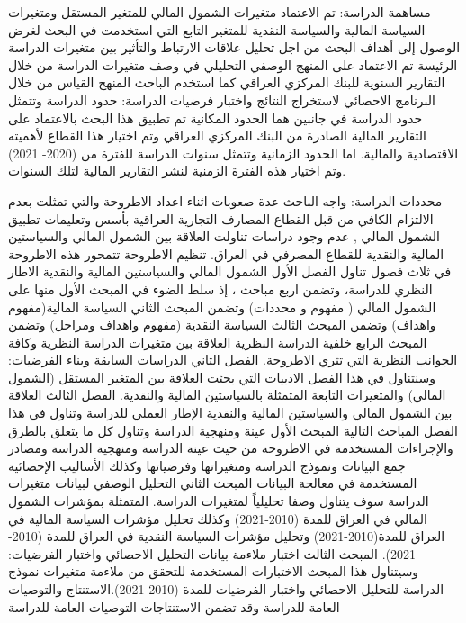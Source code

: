 \documentclass[10pt,a4paper]{report}
\begin{document}
\begin{doublespacing}
مساهمة الدراسة: تم الاعتماد متغيرات الشمول المالي للمتغير المستقل ومتغيرات السياسة المالية والسياسة النقدية للمتغير التابع التي استخدمت في البحث لغرض الوصول إلى أهداف البحث من اجل تحليل علاقات الارتباط والتأثير بين متغيرات الدراسة الرئيسة تم الاعتماد على المنهج الوصفي التحليلي في وصف متغيرات الدراسة من خلال التقارير السنوية للبنك المركزي العراقي  كما استخدم  الباحث المنهج القياس من خلال البرنامج الاحصائي لاستخراج النتائج واختبار فرضيات الدراسة: حدود الدراسة وتتمثل حدود الدراسة في جانبين هما الحدود المكانية تم تطبيق هذا البحث بالاعتماد على التقارير المالية الصادرة من البنك المركزي العراقي وتم اختيار هذا القطاع لأهميته الاقتصادية والمالية. اما الحدود الزمانية وتتمثل سنوات الدراسة للفترة من (2020- 2021) وتم اختيار هذه الفترة الزمنية لنشر التقارير المالية لتلك السنوات.

محددات الدراسة: واجه الباحث عدة صعوبات اثناء اعداد الاطروحة والتي تمثلت بعدم الالتزام  الكافي من قبل القطاع المصارف التجارية العراقية بأسس وتعليمات تطبيق الشمول المالي , عدم وجود دراسات تناولت العلاقة بين الشمول المالي والسياستين المالية والنقدية للقطاع المصرفي في العراق.
تنظيم الاطروحة تتمحور هذه الاطروحة في ثلاث فصول تناول الفصل الأول الشمول المالي والسياستين المالية والنقدية الاطار النظري للدراسة، وتضمن اربع مباحث ، إذ سلط الضوء في المبحث الأول منها على الشمول المالي ( مفهوم و محددات) وتضمن المبحث الثاني السياسة المالية(مفهوم واهداف) وتضمن المبحث الثالث السياسة النقدية (مفهوم واهداف ومراحل) وتضمن المبحث الرابع خلفية الدراسة النظرية العلاقة بين متغيرات الدراسة النظرية وكافة الجوانب النظرية التي تثري الاطروحة. الفصل الثاني الدراسات السابقة وبناء الفرضيات: وسنتناول في هذا الفصل الادبيات التي بحثت العلاقة بين المتغير المستقل (الشمول المالي) والمتغيرات التابعة المتمثلة بالسياستين المالية والنقدية. الفصل الثالث العلاقة بين الشمول المالي والسياستين المالية والنقدية الإطار العملي للدراسة وتناول في هذا الفصل المباحث التالية المبحث الأول  عينة ومنهجية الدراسة وتناول كل ما يتعلق بالطرق والإجراءات المستخدمة في الاطروحة من حيث عينة الدراسة ومنهجية الدراسة ومصادر جمع البيانات ونموذج الدراسة ومتغيراتها وفرضياتها وكذلك الأساليب الإحصائية المستخدمة في معالجة البيانات المبحث الثاني التحليل الوصفي  لبيانات متغيرات الدراسة سوف يتناول وصفا تحليلياً لمتغيرات الدراسة. المتمثلة بمؤشرات الشمول المالي في العراق للمدة (2010-2021) وكذلك تحليل مؤشرات السياسة المالية في العراق للمدة(2010-2021) وتحليل مؤشرات السياسة النقدية في العراق للمدة (2010-2021). المبحث الثالث اختبار ملاءمة بيانات التحليل الاحصائي واختبار الفرضيات: وسيتناول هذا المبحث الاختبارات المستخدمة للتحقق من ملاءمة متغيرات نموذج الدراسة للتحليل الاحصائي واختبار الفرضيات للمدة (2010-2021).الاستنتاج والتوصيات العامة للدراسة وقد تضمن الاستنتاجات التوصيات العامة للدراسة

\end{doublespacing}
\end{document}
